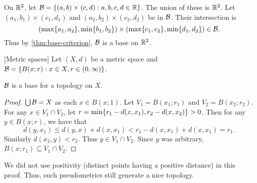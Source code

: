 \begin{examples}
    \item On $\mathbb{R}^2$, let $\mathcal{B} = \{(a, b) \times (c, d) : a, b, c, d \in \mathbb{R}\}$.
        The union of these is $\mathbb{R}^2$.
        Let $(a_1, b_1) \times (c_1, d_1)$ and
        $(a_2, b_2) \times (c_2, d_2)$ be in $\mathcal{B}$.
        Their intersection is \[
            (\max\{a_1, a_2\}, \min\{b_1, b_2\})
                \times (\max\{c_1, c_2\}, \min\{d_1, d_2\}) \in \mathcal{B}.
        \] Thus by \cref{thm:base-criterion}, $\mathcal{B}$ is a base on $\mathbb{R}^2$.
    \item{} [Metric spaces]
        Let $(X, d)$ be a metric space
        and $\mathcal{B} = \{B(x; r) : x \in X, r \in (0, \infty)\}$.
        \begin{theorem}
            $\mathcal{B}$ is a base for a topology on $X$.
        \end{theorem}
        \begin{proof}
            $\bigcup \mathcal{B} = X$ as each $x \in B(x; 1)$.
            Let $V_1 = B(x_1; r_1)$ and $V_2 = B(x_2; r_2)$.
            For any $x \in V_1 \cap V_2$,
            let $r = \min\{r_1 - d(x, x_1), r_2 - d(x, x_2)\}> 0$.
            Then for any $y \in B(x; r)$, we have that \[
                d(y, x_1) \le d(y, x) + d(x, x_1)
                    < r_1 - d(x, x_1) + d(x, x_1) = r_1.
            \]
            Similarly $d(x_2, y) < r_2$.
            Thus $y \in V_1 \cap V_2$.
            Since $y$ was arbitrary,
            $B(x; r_1) \subseteq V_1 \cap V_2$.
        \end{proof}
        We did not use positivity (distinct points having a positive
        distance) in this proof.
        Thus, such pseudometrics still generate a nice topology.
\end{examples}

